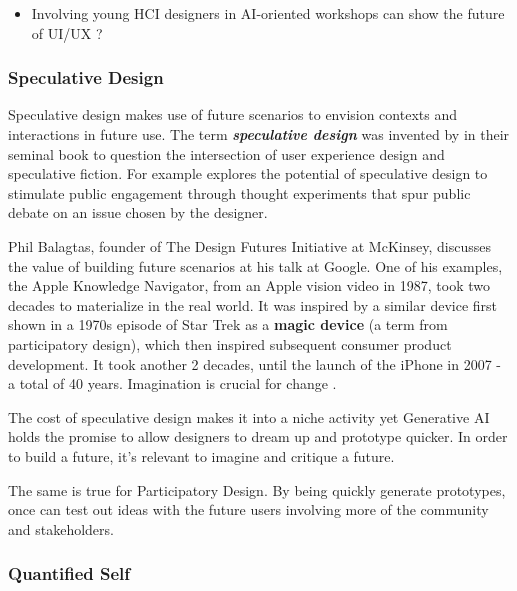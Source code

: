 \documentclass[
  letterpaper,
  DIV=11,
  numbers=noendperiod]{scrartcl}
\providecommand{\tightlist}{%
  \setlength{\itemsep}{0pt}\setlength{\parskip}{0pt}}\usepackage{longtable,booktabs,array}
\begin{document}
\begin{itemize}
\tightlist
\item
  Involving young HCI designers in AI-oriented workshops can show the
  future of UI/UX ? \citep{battistoniCanAIOrientedRequirements2023}
\end{itemize}

\subsubsection{Speculative Design}\label{speculative-design}

Speculative design makes use of future scenarios to envision contexts
and interactions in future use. The term \textbf{\emph{speculative
design}} was invented by \citet{dunneSpeculativeEverythingDesign2013} in
their seminal book to question the intersection of user experience
design and speculative fiction. For example \citet{BARENDREGT2021374}
explores the potential of speculative design to stimulate public
engagement through thought experiments that spur public debate on an
issue chosen by the designer.

Phil Balagtas, founder of The Design Futures Initiative at McKinsey,
discusses the value of building future scenarios at his talk at Google.
One of his examples, the Apple Knowledge Navigator, from an Apple vision
video in 1987, took two decades to materialize in the real world. It was
inspired by a similar device first shown in a 1970s episode of Star Trek
as a \textbf{magic device} (a term from participatory design), which
then inspired subsequent consumer product development. It took another 2
decades, until the launch of the iPhone in 2007 - a total of 40 years.
Imagination is crucial for change
\citep{googledesignDesignSpeculativeFutures2019}.

The cost of speculative design makes it into a niche activity yet
Generative AI holds the promise to allow designers to dream up and
prototype quicker. In order to build a future, it's relevant to imagine
and critique a future.

The same is true for Participatory Design. By being quickly generate
prototypes, once can test out ideas with the future users involving more
of the community and stakeholders.

\subsubsection{Quantified Self}\label{quantified-self}
\end{document}
